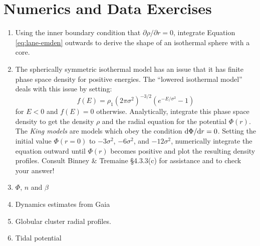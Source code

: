 \section{Numerics and Data Exercises}

\begin{enumerate}
\item Using the inner boundary condition that $\partial\rho/\partial
r=0$, integrate Equation \ref{eq:lane-emden} outwards to derive the
shape of an isothermal sphere with a core.
\item The spherically symmetric
isothermal model has an issue that it has finite phase space
density for positive energies. The ``lowered isothermal model'' deals
with this issue by setting:
\begin{equation}
f(E) = \rho_1 \left(2\pi \sigma^2\right)^{-3/2} \left( e^{-E/\sigma^2}
- 1\right)
\end{equation}
for $E<0$ and $f(E) = 0$ otherwise. Analytically, integrate this phase
space density to get the density $\rho$ and the radial equation for
the potential $\Phi(r)$. The {\it King models} are models which obey
the condition ${\rm d}\Phi/{\rm d}r=0$. Setting the initial value
$\Phi(r=0)$ to $-3\sigma^2$, $-6\sigma^2$, and $-12\sigma^2$,
numerically integrate the equation outward until $\Phi(r)$ becomes
positive and plot the resulting density profiles. Consult Binney \&
Tremaine \S4.3.3(c) for assistance and to check your answer!
\item $\Phi$, $n$ and $\beta$
\item Dynamics estimates from Gaia
\item Globular cluster radial profiles.
\item Tidal potential
\end{enumerate}


  
